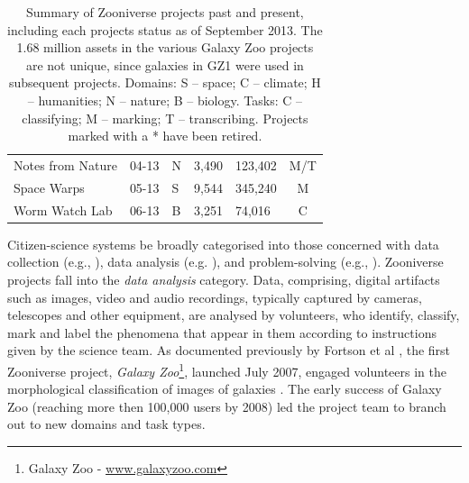 \documentclass{sigchi}
\begin{document}
\begin{table}
\begin{center}
\begin{tabular}{p{2.2cm}lp{0.7cm}llc}
Notes from Nature & 04-13 & N & 3,490 & 123,402 & M/T \\
Space Warps & 05-13 & S & 9,544 & 345,240 & M \\
Worm Watch Lab & 06-13 & B & 3,251 & 74,016 & C \\
\hline
\end{tabular}
\normalsize
\label{table:project-summary}
\caption{Summary of Zooniverse projects past and present, including each projects status as of September 2013.  The 1.68 million assets in the various Galaxy Zoo projects are not unique, since galaxies in GZ1 were used in subsequent projects. Domains: S -- space; C -- climate; H -- humanities; N -- nature; B -- biology. Tasks: C -- classifying; M -- marking; T -- transcribing. Projects marked with a * have been retired.}
\end{center}
\end{table}

Citizen-science systems be broadly categorised into those concerned with data collection (e.g., \cite{zook2010volunteered,wood2011ebird}), data analysis (e.g. \cite{westphal2005stardust,heinzelman2010crowdsourcing}), and problem-solving (e.g., \cite{khatib2011algorithm,cordero2012rna}).  Zooniverse projects fall into the \emph{data analysis} category.  Data, comprising, digital artifacts such as images, video and audio recordings, typically captured by cameras, telescopes and other equipment, are analysed by volunteers, who identify, classify, mark and label the phenomena that appear in them according to instructions given by the science team. As documented previously by Fortson et al \cite{fortson2011galaxy}, the first Zooniverse project, \emph{Galaxy Zoo}\footnote{Galaxy Zoo - \url{www.galaxyzoo.com}}, launched July 2007, engaged volunteers in the morphological classification of images of galaxies \cite{galaxyzoo-launch}. The early success of Galaxy Zoo (reaching more then 100,000 users by 2008) led the project team to branch out to new domains and task types. 
\end{document}
